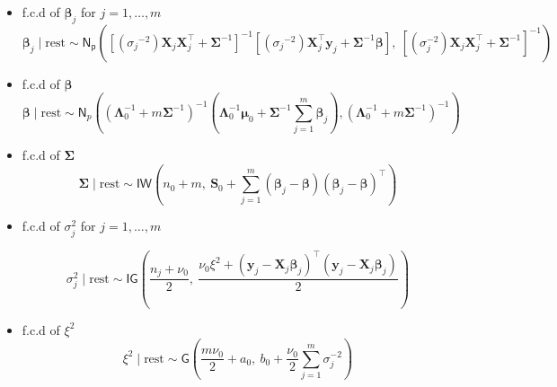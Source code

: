 \begin{itemize}
    \item f.c.d of $\bm{\beta}_j$ for $j=1,\dots,m$
    \begin{equation}
        \label{HLRM_MCMC_Betaj}
        \bm{\beta}_j \mid \text{rest} \sim \mathsf{N_p} \left( 
\left[ ({\sigma_j}^{-2}) \bm{X}_{j} \bm{X}_{j}^\top + \bm{\Sigma}^{-1} \right]^{-1}
\left[ ({\sigma_j}^{-2}) \bm{X}_{j}^\top \bm{y}_{j} + \bm{\Sigma}^{-1} \bm{\beta} \right], \ 
\left[ (\sigma_j^{-2}) \bm{X}_{j} \bm{X}_{j}^\top  + \bm{\Sigma}^{-1} \right]^{-1}
\right)
    \end{equation}
    \item f.c.d of $\bm{\beta}$
    \begin{equation}
        \label{HLRM_MCMC_Beta}
        \bm{\beta} \mid \text{rest} \sim \mathsf{N}_p \left(
\left( \bm{\Lambda}_0^{-1} + m \bm{\Sigma}^{-1} \right)^{-1}
\left( \bm{\Lambda}_0^{-1} \bm{\mu}_0 + \bm{\Sigma}^{-1} \sum_{j=1}^{m} \bm{\beta}_j \right),
\left( \bm{\Lambda}_0^{-1} + m \bm{\Sigma}^{-1} \right)^{-1}\right)
    \end{equation}
    \item f.c.d of $\bm{\Sigma}$
    \begin{equation}
        \label{HLRM_MCMC_Sigma}
        \bm{\Sigma} \mid \text{rest} \sim \mathsf{IW} \left( 
n_0 + m,\ 
\bm{S}_0 + \sum_{j=1}^{m} (\bm{\beta}_j - \bm{\beta})(\bm{\beta}_j - \bm{\beta})^\top
\right)
    \end{equation}
    
\item f.c.d of $\sigma_j^2$ for $j=1,\dots,m$
    
    \begin{equation}
        \label{HLRM_MCMC_sigma2j}
        \sigma_j^2 \mid \text{rest} \sim \mathsf{IG} \left( 
\frac{n_j + \nu_0}{2},\ 
\frac{ \nu_0 \xi^2 +  (\bm{y}_{j} - \bm{X}_{j} \bm{\beta}_j)^\top(\bm{y}_{j} - \bm{X}_{j} \bm{\beta}_j)}{2} 
\right)
    \end{equation}
    \item f.c.d of $\xi^2$
    \begin{equation}
        \label{HLRM_MCMC_xi2}
        \xi^2 \mid \text{rest} \sim \mathsf{G} \left(
\frac{m \nu_0}{2} + a_0,\ 
b_0 + \frac{\nu_0}{2} \sum_{j=1}^{m} \sigma_j^{-2}
\right)
    \end{equation}
\end{itemize}

